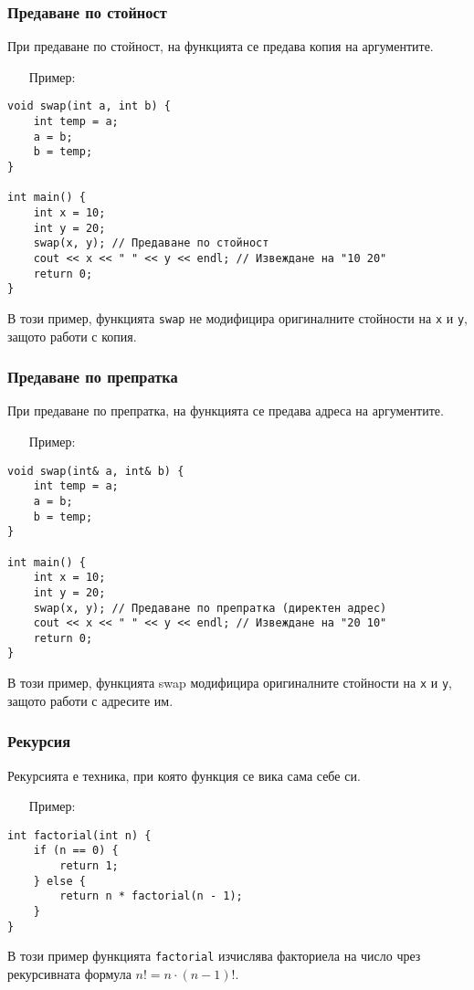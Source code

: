 \documentclass[oneside]{book}
\newcommand*{\code}[1]{\texttt{#1}}
\begin{document}
\subsubsection{Предаване по стойност}
При предаване по стойност, на функцията се предава копия на аргументите.

\begin{itemize}\item[Пример:]\end{itemize}
\begin{mdframed}\begin{lstlisting}
void swap(int a, int b) {
    int temp = a;
    a = b;
    b = temp;
}

int main() {
    int x = 10;
    int y = 20;
    swap(x, y); // Предаване по стойност
    cout << x << " " << y << endl; // Извеждане на "10 20"
    return 0;
}
\end{lstlisting}\end{mdframed}
В този пример, функцията \code{swap} не модифицира оригиналните стойности на \code{x} и \code{y}, защото работи с копия.

\subsubsection{Предаване по препратка}
При предаване по препратка, на функцията се предава адреса на аргументите.
\pagebreak
\begin{itemize}\item[Пример:]\end{itemize}
\begin{mdframed}\begin{lstlisting}
void swap(int& a, int& b) {
    int temp = a;
    a = b;
    b = temp;
}
    
int main() {
    int x = 10;
    int y = 20;
    swap(x, y); // Предаване по препратка (директен адрес)
    cout << x << " " << y << endl; // Извеждане на "20 10"
    return 0;
}
\end{lstlisting}\end{mdframed}
В този пример, функцията swap модифицира оригиналните стойности на \code{x} и \code{y}, защото работи с адресите им.
\subsubsection{Рекурсия}
Рекурсията е техника, при която функция се вика сама себе си.

\begin{itemize}\item[Пример:]\end{itemize}
\begin{mdframed}\begin{lstlisting}
int factorial(int n) {
    if (n == 0) {
        return 1;
    } else {
        return n * factorial(n - 1);
    }
}
\end{lstlisting}\end{mdframed}
В този пример функцията \code{factorial} изчислява факториела на число чрез рекурсивната формула $n! = n \cdot (n-1)!$.
\end{document}
